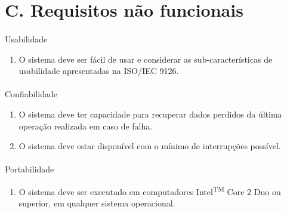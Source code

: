 \documentclass[a4paper]{article}
\begin{document}
	\section*{C. Requisitos não funcionais}
	\paragraph{}
	Usabilidade
	\begin{enumerate}[resume]
		\item O sistema deve ser fácil de usar e considerar as sub-características de usabilidade apresentadas na ISO/IEC 9126.
	\end{enumerate}
	\paragraph{}
	Confiabilidade
	\begin{enumerate}[resume]
		\item O sistema deve ter capacidade para recuperar dados perdidos da última operação realizada em caso de falha.
		\item O sistema deve estar disponível com o mínimo de interrupções possível.
	\end{enumerate}
	\paragraph{}
	Portabilidade
	\begin{enumerate}[resume]
		\item O  sistema  deve  ser  executado  em  computadores  Intel\textsuperscript{TM} Core 2 Duo  ou  superior,  em qualquer sistema operacional.
	\end{enumerate}
	\newpage
\end{document}
